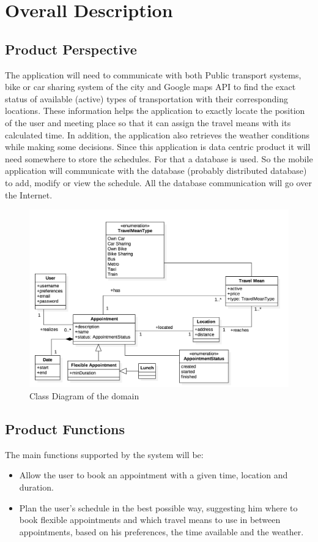 \documentclass[12pt]{article}
\begin{document}
\section{Overall Description}

\subsection{Product Perspective}
The application will need to communicate with both Public transport systems, bike or car sharing system of the city and Google maps API to find the exact status of available (active) types of transportation with their corresponding locations. These information helps the application to exactly locate the position of the user and meeting place so that it can assign the travel means with its calculated time. In addition, the application also retrieves the weather conditions while making some decisions. 
Since this application is data centric product it will need somewhere to store the schedules. For that a database is used. So the mobile application will communicate with the database (probably distributed database) to add, modify or view the schedule. All the database communication will go over the Internet.
    \begin{figure}[ht]
        \includegraphics[scale=0.52]{domainModel.png}
        \caption{Class Diagram of the domain}
    \label{fig:domainModel}
    \end{figure}
    
\subsection{Product Functions}
The main functions supported by the system will be:
\begin{itemize}
    \item Allow the user to book an appointment with a given time, location and duration.
    \item Plan the user's schedule in the best possible way, suggesting him where to book flexible appointments and which travel means to use in between appointments, based on his preferences, the time available and the weather.
\end{itemize}
\end{document}
